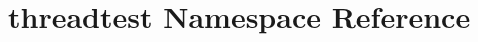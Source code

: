 \hypertarget{namespacethreadtest}{\section{threadtest Namespace Reference}
\label{namespacethreadtest}
}
